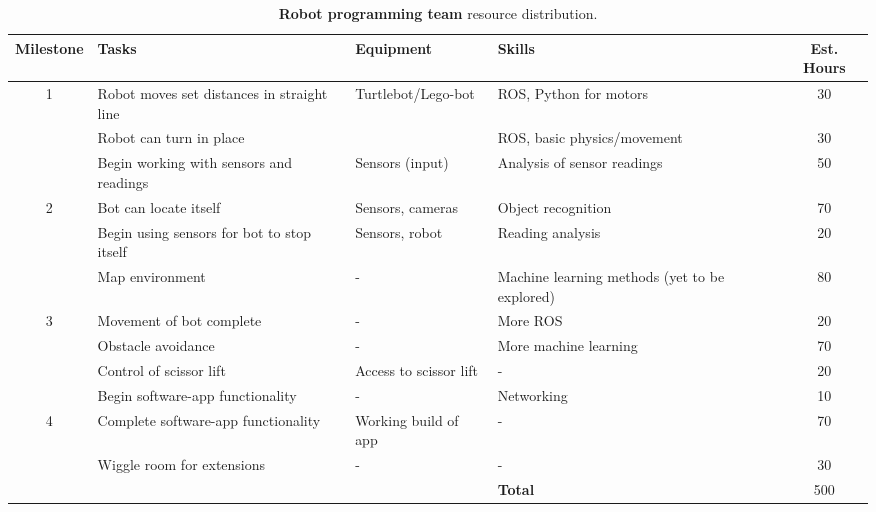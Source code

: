 \documentclass{article}
\begin{document}
\begin{table*}[]
  \begin{center}
  \begin{small}
  \begin{tabular}{|c|l|l|l|c|}
    \hline
    {\bf Milestone} & {\bf Tasks} & {\bf Equipment} & {\bf Skills} & {\bf Est. Hours} \\ \hline
    1               & Robot moves set distances in straight line & Turtlebot/Lego-bot & ROS, Python for motors & 30\\ \cline{2-5}
                    & Robot can turn in place &  & ROS, basic physics/movement & 30\\ \cline{2-5}
                    & Begin working with sensors and readings & Sensors (input) & Analysis of sensor readings & 50 \\ \hline
    2               & Bot can locate itself & Sensors, cameras & Object recognition & 70\\ \cline{2-5}
                    & Begin using sensors for bot to stop itself & Sensors, robot & Reading analysis & 20\\ \cline{2-5}
                    & Map environment & - & Machine learning methods (yet to be explored) & 80\\ \hline
    3               & Movement of bot complete & - & More ROS & 20\\ \cline{2-5}
                    & Obstacle avoidance & - & More machine learning & 70\\ \cline{2-5}
                    & Control of scissor lift & Access to scissor lift & - & 20\\ \cline{2-5}
                    & Begin software-app functionality & - & Networking & 10\\ \hline
    4               & Complete software-app functionality & Working build of app & - & 70\\ \cline{2-5}
                    & Wiggle room for extensions & - & - & 30\\ \hline
                    &  &  & {\bf Total} & 500 \\ \hline
  \end{tabular}
  \end{small}
  \caption{{\bf Robot programming team} resource distribution.}
  \label{tab:rp-rd}
  \end{center}
\end{table*}
\end{document}
